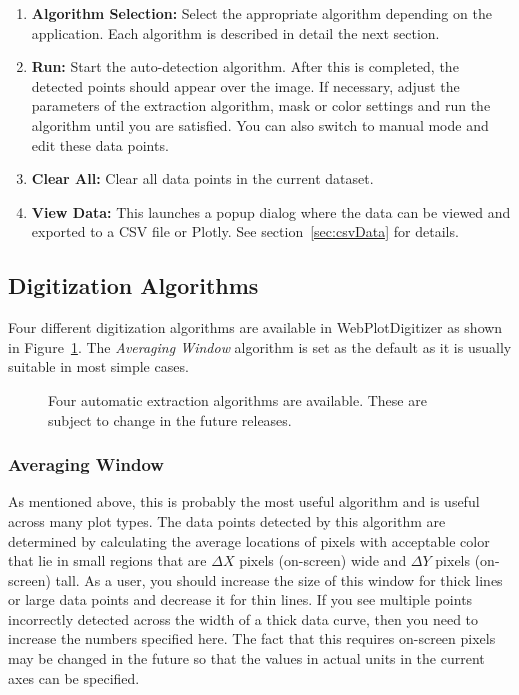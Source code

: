 \documentclass[letterpaper, 11pt]{article}
\begin{document}
\begin{enumerate}
\begin{enumerate}
\end{enumerate}
\item{{\bf Algorithm Selection: }Select the appropriate algorithm depending on the application. Each algorithm is described in detail the next section.}
\item{{\bf Run: }Start the auto-detection algorithm. After this is completed, the detected points should appear over the image. If necessary, adjust the parameters of the extraction algorithm, mask or color settings and run the algorithm until you are satisfied. You can also switch to manual mode and edit these data points.}
\item{{\bf Clear All: }Clear all data points in the current dataset.}
\item{{\bf View Data: }This launches a popup dialog where the data can be viewed and exported to a CSV file or Plotly. See section~\ref{sec:csvData} for details.}
\end{enumerate}

\subsection{Digitization Algorithms}
Four different digitization algorithms are available in WebPlotDigitizer as shown in Figure~\ref{fig:autoExtractAlgos}. The \emph{Averaging Window} algorithm is set as the default as it is usually suitable in most simple cases.
\begin{figure}
\begin{center}
\caption{Four automatic extraction algorithms are available. These are subject to change in the future releases.}
\label{fig:autoExtractAlgos}
\end{center}
\end{figure}
\subsubsection{Averaging Window}
As mentioned above, this is probably the most useful algorithm and is useful across many plot types. The data points detected by this algorithm are determined by calculating the average locations of pixels with acceptable color that lie in small regions that are $\Delta X$ pixels (on-screen) wide and $\Delta Y$ pixels (on-screen) tall. As a user, you should increase the size of this window for thick lines or large data points and decrease it for thin lines. If you see multiple points incorrectly detected across the width of a thick data curve, then you need to increase the numbers specified here. The fact that this requires on-screen pixels may be changed in the future so that the values in actual units in the current axes can be specified.
\end{document}
